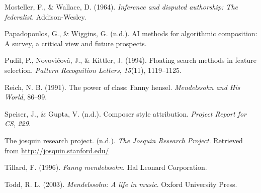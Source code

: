 \documentclass[12pt,twoside]{reedthesis}
\theoremstyle{definition}
\theoremstyle{definition}
\theoremstyle{definition}
\theoremstyle{remark}
\begin{document}
\hypertarget{ref-mosteller1964inference}{}
Mosteller, F., \& Wallace, D. (1964). \emph{Inference and disputed
authorship: The federalist}. Addison-Wesley.

\hypertarget{ref-papadopoulosai}{}
Papadopoulos, G., \& Wiggins, G. (n.d.). AI methods for algorithmic
composition: A survey, a critical view and future prospects.

\hypertarget{ref-pudil1994floating}{}
Pudil, P., Novovičová, J., \& Kittler, J. (1994). Floating search
methods in feature selection. \emph{Pattern Recognition Letters},
\emph{15}(11), 1119--1125.

\hypertarget{ref-reich1991}{}
Reich, N. B. (1991). The power of class: Fanny hensel. \emph{Mendelssohn
and His World}, 86--99.

\hypertarget{ref-CompStyleAttri}{}
Speiser, J., \& Gupta, V. (n.d.). Composer style attribution.
\emph{Project Report for CS}, \emph{229}.

\hypertarget{ref-jrp}{}
The josquin research project. (n.d.). \emph{The Josquin Research
Project}. Retrieved from \url{http://josquin.stanford.edu/}

\hypertarget{ref-tillard1996}{}
Tillard, F. (1996). \emph{Fanny mendelssohn}. Hal Leonard Corporation.

\hypertarget{ref-todd2003}{}
Todd, R. L. (2003). \emph{Mendelssohn: A life in music}. Oxford
University Press.


\end{document}
